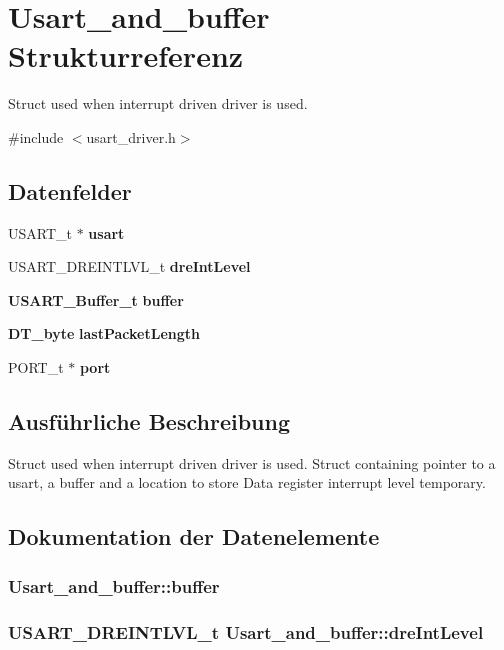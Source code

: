 \section{Usart\_\-and\_\-buffer Strukturreferenz}
\label{struct_usart__and__buffer}


Struct used when interrupt driven driver is used.  




{\ttfamily \#include $<$usart\_\-driver.h$>$}

\subsection*{Datenfelder}
\begin{DoxyCompactItemize}
\item 
USART\_\-t $\ast$ {\bf usart}
\item 
USART\_\-DREINTLVL\_\-t {\bf dreIntLevel}
\item 
{\bf USART\_\-Buffer\_\-t} {\bf buffer}
\item 
{\bf DT\_\-byte} {\bf lastPacketLength}
\item 
PORT\_\-t $\ast$ {\bf port}
\end{DoxyCompactItemize}


\subsection{Ausführliche Beschreibung}
Struct used when interrupt driven driver is used. Struct containing pointer to a usart, a buffer and a location to store Data register interrupt level temporary. 

\subsection{Dokumentation der Datenelemente}
\subsubsection[{buffer}]{ {\bf Usart\_\-and\_\-buffer::buffer}}\label{struct_usart__and__buffer_a62b4ab16cc049ca516d6ff9febddcc6c}
\subsubsection[{dreIntLevel}]{\setlength{\rightskip}{0pt plus 5cm}USART\_\-DREINTLVL\_\-t {\bf Usart\_\-and\_\-buffer::dreIntLevel}}\label{struct_usart__and__buffer_a1b9cf50ec2a8f1b6190860c67faa1ebc}
